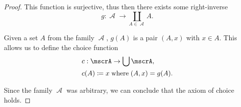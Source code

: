 \begin{proof}
  This function is surjective, thus then there exists some right-inverse
  \begin{equation*}
    g: \mscrA \to \coprod_{A \in \mscrA} A.
  \end{equation*}

  Given a set \( A \) from the family \( \mscrA \), \( g(A) \) is a pair \( (A, x) \) with \( x \in A \). This allows us to define the choice function
  \begin{equation*}
    \begin{aligned}
      &c: \mscrA \to \bigcup \mscrA, \\
      &c(A) \coloneqq x \T{where} (A, x) = g(A).
    \end{aligned}
  \end{equation*}

  Since the family \( \mscrA \) was arbitrary, we can conclude that the axiom of choice holds.
\end{proof}

